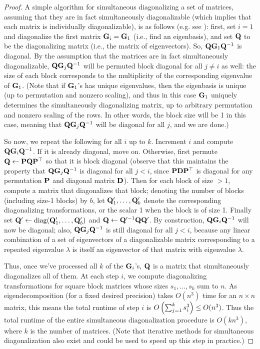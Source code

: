 \begin{proof}
A simple algorithm for simultaneous diagonalizing a set of matrices, assuming that they are in fact simultaneously diagonalizable (which implies that each matrix is individually diagonalizable), is as follows (e.g. see \cite{Conrad_theminimal, gerstner1993numerical}): first, set $i = 1$ and diagonalize the first matrix $\mathbf{G}_i = \mathbf{G}_1$ (i.e., find an eigenbasis), and set $\mathbf{Q}$ to be the diagonalizing matrix (i.e., the matrix of eigenvectors). So, $\mathbf{Q} \mathbf{G}_1 \mathbf{Q}^{-1}$ is diagonal.
By the assumption that the matrices are in fact simultaneously diagonalizable, $\mathbf{Q} \mathbf{G}_j \mathbf{Q}^{-1}$ will be permuted block diagonal for all $j \ne i$ as well: the size of each block corresponds to the multiplicity of the corresponding eigenvalue of $\mathbf{G}_1$. (Note that if $\mathbf{G}_1$'s has unique eigenvalues, then the eigenbasis is unique (up to permutation and nonzero scaling), and thus in this case $\mathbf{G}_1$ uniquely determines the simultaneously diagonalizing matrix, up to arbitrary permutation and nonzero scaling of the rows. In other words, the block size will be 1 in this case, meaning that $\mathbf{Q} \mathbf{G}_j \mathbf{Q}^{-1}$ will be diagonal for all $j$, and we are done.)

So now, we repeat the following for all $i$ up to $k$. Increment $i$ and compute $\mathbf{Q} \mathbf{G}_i \mathbf{Q}^{-1}$. If it is already diagonal, move on. Otherwise, first permute $\mathbf{Q} \leftarrow \mathbf{P} \mathbf{Q} \mathbf{P}^\top$ so that it is block diagonal (observe that this maintains the property that $\mathbf{Q} \mathbf{G}_j \mathbf{Q}^{-1}$ is diagonal for all $j < i$, since $\mathbf{P} \mathbf{D} \mathbf{P}^\top$ is diagonal for any permutation $\mathbf{P}$ and diagonal matrix $\mathbf{D}$). Then for each block of size $> 1$, compute a matrix that diagonalizes that block; denoting the number of blocks (including size-1 blocks) by $b$, let $\mathbf{Q}_1', \dots, \mathbf{Q}_b'$ denote the corresponding diagonalizing transformations, or the scalar 1 when the block is of size 1. Finally set $\mathbf{Q}' \leftarrow \mathrm{diag}(\mathbf{Q}_1', \dots, \mathbf{Q}_b') $ and $\mathbf{Q} \leftarrow \mathbf{Q}'^{-1} \mathbf{Q} \mathbf{Q}'$. By construction, $\mathbf{Q} \mathbf{G}_i \mathbf{Q}^{-1}$ will now be diagonal; also, $\mathbf{Q} \mathbf{G}_j \mathbf{Q}^{-1}$ is still diagonal for all $j < i$, because any linear combination of a set of eigenvectors of a diagonalizable matrix corresponding to a repeated eigenvalue $\lambda$ is itself an eigenvector of that matrix with eigenvalue $\lambda$.

Thus, once we've processed all $k$ of the $\mathbf{G}_i$'s, $\mathbf{Q}$ is a matrix that simultaneously diagonalizes all of them. At each step $i$, we compute diagonalizing transformations for square block matrices whose sizes $s_1, \dots, s_k$ sum to $n$. As eigendecomposition (for a fixed desired precision) takes $O(n^3)$ time for an $n \times n$ matrix, this means the total runtime of step $i$ is $O\left( \sum_{j=1}^{k} s_i^3 \right) \le O(n^3)$. Thus the total runtime of the entire simultaneous diagonalization procedure is $O(kn^3)$, where $k$ is the number of matrices. (Note that iterative methods for simultaneous diagonalization also exist \citep{gerstner1993numerical,akema2020approximate} and could be used to speed up this step in practice.)


\end{proof}
